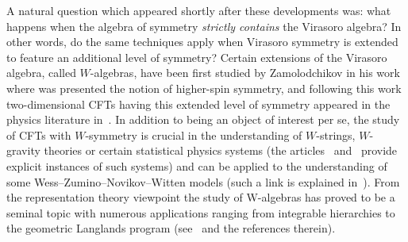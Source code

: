 \documentclass[10pt]{amsart}
\theoremstyle{definition}\newtheorem{defi}[theo]{Definition}\newtheorem{rema}[theo]{Remark}\newtheorem{exam}[theo]{Example}\newtheorem{exem}[theo]{Example}\newtheorem{nota}[theo]{Notation}
\begin{document}
A natural question which appeared shortly after these developments was: what happens when the algebra of symmetry \emph{strictly contains} the Virasoro algebra? In other words, do the same techniques apply when Virasoro symmetry is extended to feature an additional level of symmetry? Certain extensions of the Virasoro algebra, called $W$-algebras, have been first studied by Zamolodchikov in his work~\cite{Za85} where was presented the notion of higher-spin symmetry, and following this work two-dimensional CFTs having this extended level of symmetry appeared in the physics literature in~\cite{FaLu,FaZa}. In addition to being an object of interest per se, the study of CFTs with $W$-symmetry is crucial in the understanding of $W$-strings, $W$-gravity theories or certain statistical physics systems (the articles~\cite{FaZa2} and~\cite{JMO} provide explicit instances of such systems) and can be applied to the understanding of some Wess--Zumino--Novikov--Witten models (such a link is explained in~\cite{FORTW}). From the representation theory viewpoint the study of W-algebras has proved to be a seminal topic with numerous applications ranging from integrable hierarchies to the geometric Langlands program (see~\cite{Arakawa_intro} and the references therein).
\end{document}
